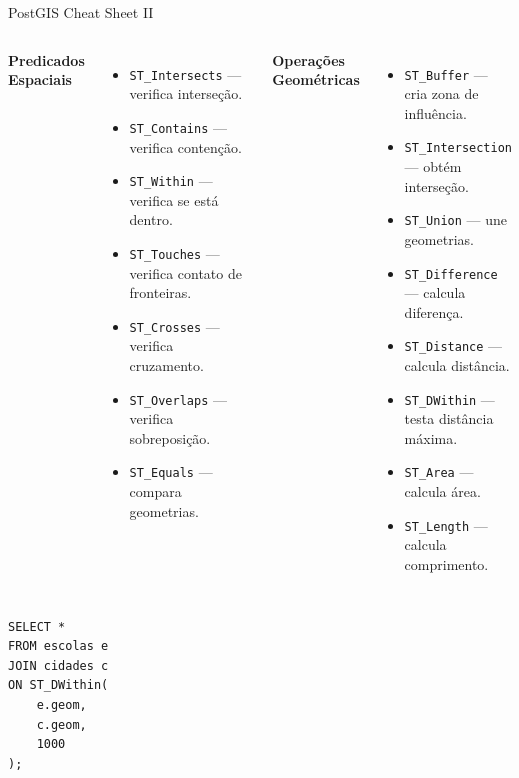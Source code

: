 \documentclass{beamer}
\begin{document}
\begin{frame}[fragile]{PostGIS Cheat Sheet II}

\scriptsize

\begin{columns}[t]


\textbf{Predicados Espaciais}

\begin{itemize}
    \item \texttt{ST\_Intersects} --- verifica interseção.
    \item \texttt{ST\_Contains} --- verifica contenção.
    \item \texttt{ST\_Within} --- verifica se está dentro.
    \item \texttt{ST\_Touches} --- verifica contato de fronteiras.
    \item \texttt{ST\_Crosses} --- verifica cruzamento.
    \item \texttt{ST\_Overlaps} --- verifica sobreposição.
    \item \texttt{ST\_Equals} --- compara geometrias.
\end{itemize}


\textbf{Operações Geométricas}

\begin{itemize}
    \item \texttt{ST\_Buffer} --- cria zona de influência.
    \item \texttt{ST\_Intersection} --- obtém interseção.
    \item \texttt{ST\_Union} --- une geometrias.
    \item \texttt{ST\_Difference} --- calcula diferença.
    \item \texttt{ST\_Distance} --- calcula distância.
    \item \texttt{ST\_DWithin} --- testa distância máxima.
    \item \texttt{ST\_Area} --- calcula área.
    \item \texttt{ST\_Length} --- calcula comprimento.
\end{itemize}

\end{columns}

\vspace{0.3cm}

\begin{verbatim}
SELECT *
FROM escolas e
JOIN cidades c
ON ST_DWithin(
    e.geom,
    c.geom,
    1000
);
\end{verbatim}

\end{frame}
\end{document}
